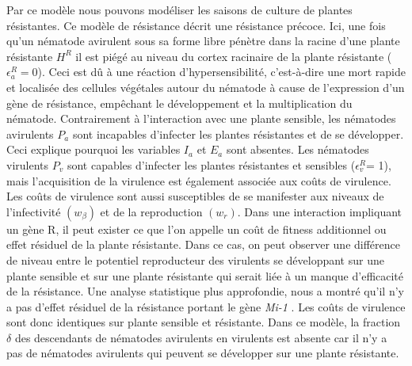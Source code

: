 	Par ce modèle nous pouvons modéliser les saisons de culture de plantes résistantes. Ce modèle de résistance décrit une résistance précoce.
Ici, une fois qu'un nématode avirulent sous sa forme libre  pénètre dans la racine d'une plante résistante $H^R$ il est piégé au niveau du cortex  racinaire de la plante résistante ($\epsilon_a^R=0$). Ceci est dû à  une réaction d'hypersensibilité, c'est-à-dire  une mort rapide et localisée des cellules végétales autour du
nématode à cause de l’expression d’un gène de résistance, empêchant le développement et la multiplication du nématode.  Contrairement à l'interaction avec une plante sensible, les nématodes avirulents  $P_a$  sont incapables d'infecter les plantes résistantes et de se développer. Ceci  explique pourquoi les variables $I_a$ et $E_a$ sont absentes. Les nématodes virulents $P_v$ sont capables d'infecter les plantes résistantes et sensibles ($\epsilon_v^R$= 1), mais l'acquisition de la virulence  est également associée aux coûts de virulence. Les coûts de virulence sont aussi susceptibles de se manifester aux niveaux de l'infectivité $(w_\beta)$  et de la  reproduction $(w_r)$. Dans une interaction impliquant un gène R,  il peut exister ce que l'on appelle  un coût de fitness additionnel ou \og effet résiduel \fg{} de la plante résistante. Dans ce cas, on peut observer une différence de niveau entre le potentiel reproducteur des virulents se développant sur une plante sensible et sur une plante  résistante qui serait liée à un manque d’efficacité de la résistance.  Une analyse  statistique plus approfondie, nous a montré qu’il n’y a pas d’effet résiduel de la résistance portant  le gène \textit{Mi-1} \citep{Castagnone-Sereno2007}. Les coûts de virulence sont donc identiques sur plante sensible et résistante.
Dans ce modèle, la fraction $\delta$ des descendants de nématodes avirulents en virulents est absente car il n'y a pas de nématodes avirulents qui peuvent se développer sur une plante résistante.    
	
